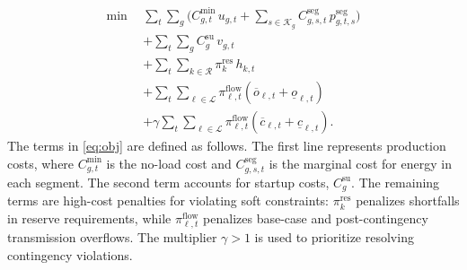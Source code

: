 \documentclass{ieeeaccess}
\begin{document}
\begin{align}
\min \ \ & \sum_{t}\sum_{g}\Big( C^{\min}_{g,t}\,u_{g,t} + \sum_{s\in\mathcal{K}_g} C^{\mathrm{seg}}_{g,s,t}\, p^{\mathrm{seg}}_{g,t,s} \Big) \nonumber\\
& + \sum_{t}\sum_{g} C^{\mathrm{su}}_g\, v_{g,t} \label{eq:obj}\\
& + \sum_{t}\sum_{k\in\mathcal{R}} \pi^{\mathrm{res}}_k\, h_{k,t} \nonumber\\
& + \sum_{t}\sum_{\ell\in\mathcal{L}} \pi^{\mathrm{flow}}_{\ell,t}(\overline{o}_{\ell,t}+\underline{o}_{\ell,t}) \nonumber\\
& + \gamma \sum_{t}\sum_{\ell\in\mathcal{L}} \pi^{\mathrm{flow}}_{\ell,t}(\overline{c}_{\ell,t}+\underline{c}_{\ell,t}). \nonumber
\end{align}
The terms in \eqref{eq:obj} are defined as follows. The first line represents production costs, where $C^{\min}_{g,t}$ is the no-load cost and $C^{\mathrm{seg}}_{g,s,t}$ is the marginal cost for energy in each segment. The second term accounts for startup costs, $C^{\mathrm{su}}_g$. The remaining terms are high-cost penalties for violating soft constraints: $\pi^{\mathrm{res}}_k$ penalizes shortfalls in reserve requirements, while $\pi^{\mathrm{flow}}_{\ell,t}$ penalizes base-case and post-contingency transmission overflows. The multiplier $\gamma>1$ is used to prioritize resolving contingency violations.
\end{document}
